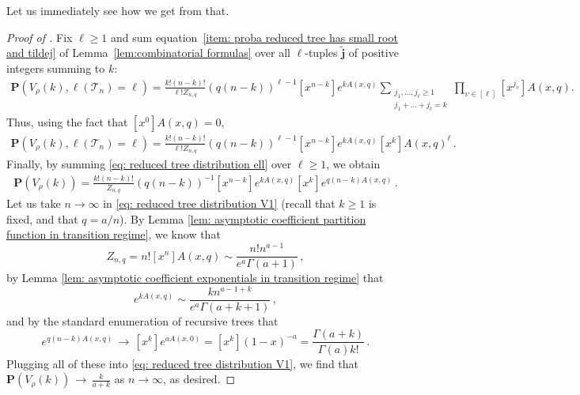 \documentclass{article}
\theoremstyle{remark}
\newcommand{\cv}[1]{\,\underset{#1}{\longrightarrow}\,}
\newcommand{\cT}{\mathcal{T}}
\newcommand{\bj}{\mathbf{j}}
\newcommand{\wbj}{\widetilde{\bj}}
\newcommand{\prob}[1]{\mathbf{P}{\left(#1\right)}}
\begin{document}
Let us immediately see how we get  from that.

\begin{proof}[Proof of ]
Fix $\ell\ge1$ and sum equation~\eqref{item: proba reduced tree has small root and tildej} of Lemma~\ref{lem:combinatorial formulas} over all $\ell$-tuples $\wbj$ of positive integers summing to $k$:
\begin{align*}
    \prob{V_\rho(k), \ell(\cT_n)=\ell}
    = \frac{k!(n-k)!}{\ell! Z_{n,q}} \left(q(n-k)\right)^{\ell-1}
    [x^{n-k}] e^{k A(x,q)}
    \sum_{\substack{j_1, \dots, j_\ell \ge1\\ j_1+\dots+j_\ell =k}} \prod_{\upsilon\in [\ell]}
    [x^{j_\upsilon}] A(x,q).
\end{align*}
Thus, using the fact that $[x^0] A(x,q) = 0$,
\begin{align}\label{eq: reduced tree distribution ell}
    \prob{V_\rho(k), \ell(\cT_n)=\ell}
    = \frac{k!(n-k)!}{\ell! Z_{n,q}} \left(q(n-k)\right)^{\ell-1}
    [x^{n-k}] e^{k A(x,q)}
    [x^{k}] A(x,q)^\ell \,.
\end{align}
Finally, by summing \eqref{eq: reduced tree distribution ell} over $\ell\ge1$, we obtain
\begin{align}\label{eq: reduced tree distribution V1}
    \prob{V_\rho(k)}
    = \frac{k!(n-k)!}{Z_{n,q}} \left(q(n-k)\right)^{-1}
    [x^{n-k}] e^{k A(x,q)}
    [x^{k}] e^{q(n-k)A(x,q)} \,.
\end{align}
    Let us take $n\to\infty$ in \eqref{eq: reduced tree distribution V1} (recall that $k\ge1$ is fixed, and that $q=a/n$).
    By Lemma \ref{lem: asymptotic coefficient partition function in transition regime}, we know that 
    \begin{equation*}
        Z_{n,q} = n! [x^n] A(x,q) \sim \frac{n! n^{a-1}}{e^a \Gamma(a+1)} \,,
    \end{equation*}
    by Lemma \ref{lem: asymptotic coefficient exponentials in transition regime} that 
    \begin{equation*}
        [x^{n-k}] e^{k A(x,q)} \sim \frac{k n^{a-1+k}}{e^a\Gamma(a+k+1)} \,,
    \end{equation*}
    and by the standard enumeration of recursive trees that 
    \begin{equation*}
        [x^{k}] e^{q(n-k)A(x,q)} 
        \cv{} [x^k] e^{a A(x,0)}
        = [x^k] (1-x)^{-a}
        = \frac{\Gamma(a+k)}{\Gamma(a)k!} \,.
    \end{equation*}
    Plugging all of these into \eqref{eq: reduced tree distribution V1}, we find that $\prob{V_\rho(k)} \cv{} \frac{k}{a+k}$ as $n \rightarrow \infty$, as desired.
\end{proof}
\end{document}

